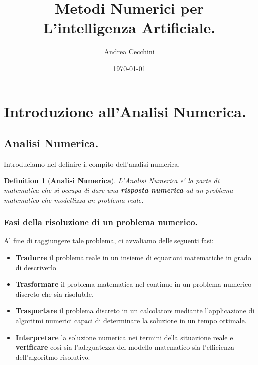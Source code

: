 \documentclass{article}
\author{Andrea Cecchini}
\title{\textbf{Metodi Numerici per \\ L'intelligenza Artificiale.}}
\date{\today}
\newtheorem{definition}{Definition}
\begin{document}
\maketitle
\newpage
\tableofcontents
\newpage
\section{Introduzione all'Analisi Numerica.}
\subsection{Analisi Numerica.}
Introduciamo nel definire il compito dell'analisi numerica.
%
\begin{definition}[\textbf{Analisi Numerica}] L'Analisi Numerica e` la parte di matematica 
%
    che si occupa di dare una \textbf{risposta numerica} ad un problema matematico
%
    che modellizza un problema reale. 
\end{definition}
\subsubsection{Fasi della risoluzione di un problema numerico.}
%
Al fine di raggiungere tale problema, ci avvaliamo delle seguenti fasi:
%
\begin{itemize}
    \item \textbf{Tradurre} il problema reale in un insieme di equazioni 
%
    matematiche in grado di descriverlo
    \item \textbf{Trasformare} il problema matematica nel continuo in un 
%
    problema numerico discreto che sia risolubile.
    \item \textbf{Trasportare}  il problema discreto in un calcolatore mediante 
%
    l’applicazione di algoritmi numerici capaci di determinare la soluzione 
%
    in un tempo ottimale.
    \item \textbf{Interpretare} la soluzione numerica nei termini 
%
    della situazione reale e \textbf{verificare} così sia l’adeguatezza del modello 
%
    matematico sia l’efficienza dell’algoritmo risolutivo.
\end{itemize}
\end{document}
